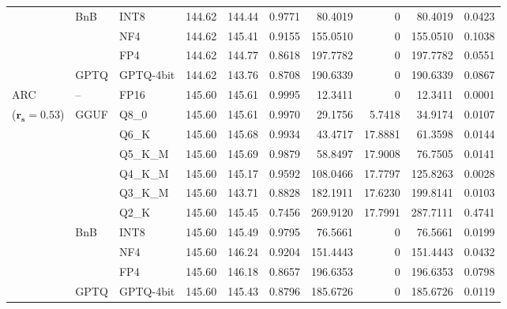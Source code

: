 \begin{longtable}{ll l rrrrrrr}
 & BnB & INT8 & 144.62 & 144.44 & 0.9771 & 80.4019 & \cellcolor{cyan!12} $0$ & 80.4019 & 0.0423 \\
 &  & NF4 & 144.62 & 145.41 & \cellcolor{red!18} 0.9155 & \cellcolor{red!18} 155.0510 & \cellcolor{cyan!12} $0$ & \cellcolor{red!18} 155.0510 & \cellcolor{red!18} 0.1038 \\
 &  & FP4 & 144.62 & 144.77 & \cellcolor{red!18} 0.8618 & \cellcolor{red!18} 197.7782 & \cellcolor{cyan!12} $0$ & \cellcolor{red!18} 197.7782 & \cellcolor{red!18} 0.0551 \\
 & GPTQ & GPTQ-4bit & 144.62 & 143.76 & \cellcolor{red!18} 0.8708 & \cellcolor{red!18} 190.6339 & \cellcolor{cyan!12} $0$ & \cellcolor{red!18} 190.6339 & \cellcolor{red!18} 0.0867 \\
\midrule
ARC & -- & FP16 & 145.60 & 145.61 & 0.9995 & 12.3411 & \cellcolor{cyan!12} $0$ & 12.3411 & 0.0001 \\
{\small ($\mathbf{r_s{=}0.53}$)} & GGUF & Q8\_0 & 145.60 & 145.61 & 0.9970 & 29.1756 & 5.7418 & 34.9174 & 0.0107 \\
 &  & Q6\_K & 145.60 & 145.68 & 0.9934 & 43.4717 & 17.8881 & 61.3598 & 0.0144 \\
 &  & Q5\_K\_M & 145.60 & 145.69 & 0.9879 & 58.8497 & 17.9008 & 76.7505 & 0.0141 \\
 &  & Q4\_K\_M & 145.60 & 145.17 & 0.9592 & 108.0466 & 17.7797 & 125.8263 & 0.0028 \\
 &  & Q3\_K\_M & 145.60 & 143.71 & \cellcolor{red!18} 0.8828 & \cellcolor{red!18} 182.1911 & 17.6230 & \cellcolor{red!18} 199.8141 & \cellcolor{red!18} 0.0103 \\
 &  & Q2\_K & 145.60 & 145.45 & \cellcolor{red!35} 0.7456 & \cellcolor{red!35} 269.9120 & 17.7991 & \cellcolor{red!35} 287.7111 & \cellcolor{red!35} 0.4741 \\
 & BnB & INT8 & 145.60 & 145.49 & 0.9795 & 76.5661 & \cellcolor{cyan!12} $0$ & 76.5661 & 0.0199 \\
 &  & NF4 & 145.60 & 146.24 & \cellcolor{red!18} 0.9204 & \cellcolor{red!18} 151.4443 & \cellcolor{cyan!12} $0$ & \cellcolor{red!18} 151.4443 & \cellcolor{red!18} 0.0432 \\
 &  & FP4 & 145.60 & 146.18 & \cellcolor{red!18} 0.8657 & \cellcolor{red!18} 196.6353 & \cellcolor{cyan!12} $0$ & \cellcolor{red!18} 196.6353 & \cellcolor{red!18} 0.0798 \\
 & GPTQ & GPTQ-4bit & 145.60 & 145.43 & \cellcolor{red!18} 0.8796 & \cellcolor{red!18} 185.6726 & \cellcolor{cyan!12} $0$ & \cellcolor{red!18} 185.6726 & \cellcolor{red!18} 0.0119 \\

\end{longtable}
